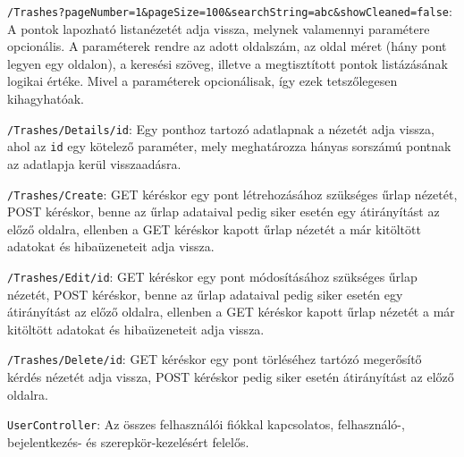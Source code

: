 \begin{compactitem}
	\item \texttt{/Trashes?pageNumber=1\&pageSize=100\&searchString=abc\&showCleaned=false}: A pontok lapozható listanézetét adja vissza, melynek valamennyi paramétere opcionális. A paraméterek rendre az adott oldalszám, az oldal méret (hány pont legyen egy oldalon), a keresési szöveg, illetve a megtisztított pontok listázásának logikai értéke. Mivel a paraméterek opcionálisak, így ezek tetszőlegesen kihagyhatóak.
	\item \texttt{/Trashes/Details/id}: Egy ponthoz tartozó adatlapnak a nézetét adja vissza, ahol az \texttt{id} egy kötelező paraméter, mely meghatározza hányas sorszámú pontnak az adatlapja kerül visszaadásra.
	\item \texttt{/Trashes/Create}: GET kéréskor egy pont létrehozásához szükséges űrlap nézetét, POST kéréskor, benne az űrlap adataival pedig siker esetén egy átirányítást az előző oldalra, ellenben a GET kéréskor kapott űrlap nézetét a már kitöltött adatokat és hibaüzeneteit adja vissza.
	\item \texttt{/Trashes/Edit/id}: GET kéréskor egy pont módosításához szükséges űrlap nézetét, POST kéréskor, benne az űrlap adataival pedig siker esetén egy átirányítást az előző oldalra, ellenben a GET kéréskor kapott űrlap nézetét a már kitöltött adatokat és hibaüzeneteit adja vissza.
	\item \texttt{/Trashes/Delete/id}: GET kéréskor egy pont törléséhez tartózó megerősítő kérdés nézetét adja vissza, POST kéréskor pedig siker esetén átirányítást az előző oldalra.
\end{compactitem}
\texttt{UserController}: Az összes felhasználói fiókkal kapcsolatos, felhasználó-, bejelentkezés- és szerepkör-kezelésért felelős.
